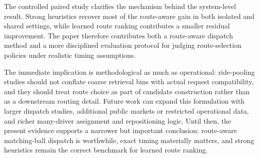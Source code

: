 \documentclass[journal]{IEEEtran}
\begin{document}
The controlled paired study clarifies the mechanism behind the system-level result. Strong heuristics recover most of the route-aware gain in both isolated and shared settings, while learned route ranking contributes a smaller residual improvement. The paper therefore contributes both a route-aware dispatch method and a more disciplined evaluation protocol for judging route-selection policies under realistic timing assumptions.

The immediate implication is methodological as much as operational: ride-pooling studies should not conflate coarse retrieval bins with actual request compatibility, and they should treat route choice as part of candidate construction rather than as a downstream routing detail. Future work can expand this formulation with larger dispatch studies, additional public markets or restricted operational data, and richer many-driver assignment and repositioning logic. Until then, the present evidence supports a narrower but important conclusion: route-aware matching-ball dispatch is worthwhile, exact timing materially matters, and strong heuristics remain the correct benchmark for learned route ranking.



\end{document}
